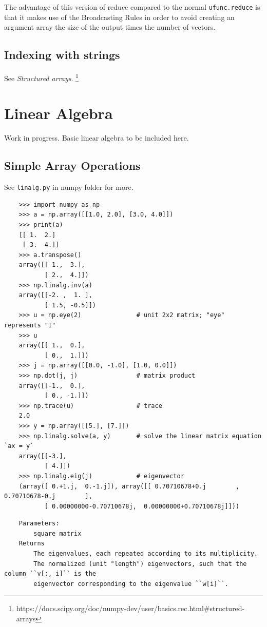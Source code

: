 \documentclass[UTF8]{article}
\begin{document}
The advantage of this version of reduce compared to the normal \texttt{ufunc.reduce} is that it
makes use of the Broadcasting Rules in order to avoid creating an argument array the size of the
output times the number of vectors.

\subsection{Indexing with strings}
See \emph{Structured arrays}.
\footnote{https://docs.scipy.org/doc/numpy-dev/user/basics.rec.html\#structured-arrays}

\section{Linear Algebra}
Work in progress. Basic linear algebra to be included here.

\subsection{Simple Array Operations}
See \texttt{linalg.py} in numpy folder for more.
\begin{verbatim}
    >>> import numpy as np
    >>> a = np.array([[1.0, 2.0], [3.0, 4.0]])
    >>> print(a)
    [[ 1.  2.]
     [ 3.  4.]]
    >>> a.transpose()
    array([[ 1.,  3.],
           [ 2.,  4.]])
    >>> np.linalg.inv(a)
    array([[-2. ,  1. ],
           [ 1.5, -0.5]])
    >>> u = np.eye(2)               # unit 2x2 matrix; "eye" represents "I"
    >>> u
    array([[ 1.,  0.],
           [ 0.,  1.]])
    >>> j = np.array([[0.0, -1.0], [1.0, 0.0]])
    >>> np.dot(j, j)                # matrix product
    array([[-1.,  0.],
           [ 0., -1.]])
    >>> np.trace(u)                 # trace
    2.0
    >>> y = np.array([[5.], [7.]])
    >>> np.linalg.solve(a, y)       # solve the linear matrix equation `ax = y`
    array([[-3.],
           [ 4.]])
    >>> np.linalg.eig(j)            # eigenvector
    (array([ 0.+1.j,  0.-1.j]), array([[ 0.70710678+0.j        ,  0.70710678-0.j        ],
           [ 0.00000000-0.70710678j,  0.00000000+0.70710678j]]))
\end{verbatim}
\begin{verbatim}
    Parameters:
        square matrix
    Returns
        The eigenvalues, each repeated according to its multiplicity.
        The normalized (unit "length") eigenvectors, such that the column ``v[:, i]`` is the
        eigenvector corresponding to the eigenvalue ``w[i]``.
\end{verbatim}
\end{document}
